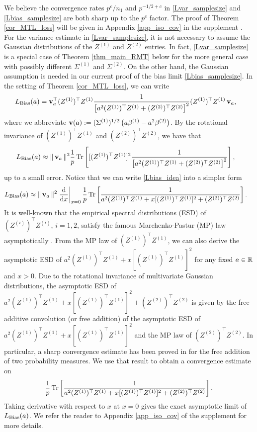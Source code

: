 We believe the convergence rates $p^c/n_1$ and $p^{-1/2+c}$ in \eqref{Lvar_samplesize} and \eqref{Lbias_samplesize} are both sharp up to the $p^c$ factor. The proof of Theorem \ref{cor_MTL_loss} will be given in Appendix \ref{app_iso_cov} in the supplement \cite{MTL_suppl}. For the variance estimate in \eqref{Lvar_samplesize}, it is not necessary to assume the Gaussian distributions of the $Z^{(1)}$ and $Z^{(2)}$ entries. In fact, \eqref{Lvar_samplesize} is a special case of Theorem \ref{thm_main_RMT} below for the more general case with possibly different $\Sigma^{(1)}$ and $\Sigma^{(2)}$. On the other hand, the Gaussian assumption is needed in our current proof of the bias limit \eqref{Lbias_samplesize}. In the setting of Theorem \ref{cor_MTL_loss}, we can write
\begin{align*}
L_{\bias} (a)&=\bv_a^\top (Z^{(1)})^\top Z^{(1)} \frac1{ \left[a^2(Z^{(1)})^\top Z^{(1)}+ (Z^{(2)})^\top Z^{(2)}  \right]^{2}}(Z^{(1)})^\top Z^{(1)} \bv_a,
\end{align*}
where we abbreviate $\operatorname{\mathbf{v}}(a):=(\Sigma^{(1)})^{1/2}\left(a\beta^{(1)}- a^2\beta^{(2)}\right)$. By the rotational invariance of $(Z^{(1)})^\top Z^{(1)}$ and $(Z^{(2)})^\top Z^{(2)}$, we have that
\begin{align}\label{Lbias_idea}
L_{\bias} (a)&\approx \|\bv_a\|^2 \frac1p\bigtr{ [(Z^{(1)})^\top Z^{(1)}]^2 \frac1{ \left[a^2(Z^{(1)})^\top Z^{(1)}+ (Z^{(2)})^\top Z^{(2)}\right]^{2}}  },
\end{align}
up to a small error. Notice that we can write \eqref{Lbias_idea} into a simpler form
\begin{align}\nonumber %
L_{\bias} (a)&\approx \|\bv_a\|^2 \left. \frac{\dd }{\dd x}\right|_{x=0}\frac1p\bigtr{  \frac1{ a^2(Z^{(1)})^\top Z^{(1)}+ x[(Z^{(1)})^\top Z^{(1)}]^2+(Z^{(2)})^\top Z^{(2)} }  }.
\end{align}
It is well-known that the empirical spectral distributions (ESD) of $(Z^{(i)})^\top Z^{(i)}$, $i=1,2$, satisfy the famous Marchenko-Pastur (MP) law asymptotically \cite{MP}. From the MP law of $(Z^{(1)})^\top Z^{(1)}$, we can also derive the asymptotic ESD of $a^2(Z^{(1)})^\top Z^{(1)}+ x[(Z^{(1)})^\top Z^{(1)}]^2$ for any fixed $a\in \mathbb{R}$ and $x>0$. Due to the rotational invariance of multivariate Gaussian distributions,
the asymptotic ESD of $a^2(Z^{(1)})^\top Z^{(1)}+ x[(Z^{(1)})^\top Z^{(1)}]^2+(Z^{(2)})^\top Z^{(2)}$ is given by the free additive convolution (or free addition) of the asymptotic ESD of $a^2(Z^{(1)})^\top Z^{(1)}+ x[(Z^{(1)})^\top Z^{(1)}]^2$ and the MP law of $(Z^{(2)})^\top Z^{(2)}$\cite{nica2006lectures}. In particular, a sharp convergence estimate has been proved in \cite{BES_free1,BES_free2} for the free addition of two probability measures. We use that result to obtain a convergence estimate on
$$\frac1p\operatorname{Tr}\left[  \frac1{ a^2(Z^{(1)})^\top Z^{(1)}+ x[(Z^{(1)})^\top Z^{(1)}]^2+(Z^{(2)})^\top Z^{(2)} }  \right].$$
Taking derivative with respect to $x$ at $x=0$ gives the exact asymptotic limit of $L_{\textup{Bias}}(a)$. We refer the reader to Appendix \ref{app_iso_cov} of the supplement \cite{MTL_suppl} for more details.

